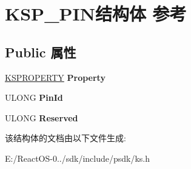 \hypertarget{struct_k_s_p___p_i_n}{}\section{K\+S\+P\+\_\+\+P\+I\+N结构体 参考}
\label{struct_k_s_p___p_i_n}
\subsection*{Public 属性}
\begin{DoxyCompactItemize}
\item 
\mbox{\label{struct_k_s_p___p_i_n_a69ef465f32c95fd3a8423710adcbe9bd}} 
\hyperlink{struct_k_s_i_d_e_n_t_i_f_i_e_r}{K\+S\+P\+R\+O\+P\+E\+R\+TY} {\bfseries Property}
\item 
\mbox{\label{struct_k_s_p___p_i_n_a7d30633c0a1e9de7dbadb526e89081d0}} 
U\+L\+O\+NG {\bfseries Pin\+Id}
\item 
\mbox{\label{struct_k_s_p___p_i_n_a6823174c71751e5a1cb4a0020ddeed1d}} 
U\+L\+O\+NG {\bfseries Reserved}
\end{DoxyCompactItemize}


该结构体的文档由以下文件生成\+:\begin{DoxyCompactItemize}
\item 
E\+:/\+React\+O\+S-\/0../sdk/include/psdk/ks.\+h\end{DoxyCompactItemize}
